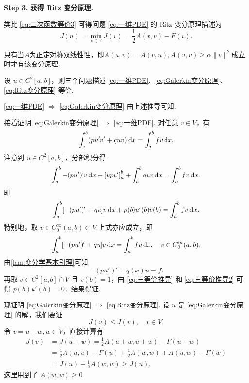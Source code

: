 \noindent\textbf{Step 3. 获得 Ritz 变分原理.} 

类比 \eqref{eq:二次函数等价3} 可得问题 \eqref{eq:一维PDE} 的 Ritz 变分原理描述为
\begin{equation}\label{eq:Ritz变分原理}
    J(u) = \min_{v \in V} J(v) = \frac{1}{2}A(v, v) - F(v).
\end{equation}
\begin{remark}
    只有当$A$为正定对称双线性性，即$A(u,v)=A(v,u),A(u,v)\geq \alpha\|v\|^2$成立时才有该变分原理.
\end{remark}


\begin{theorem}
设 $u \in C^2[a, b]$，则三个问题描述 \eqref{eq:一维PDE}、\eqref{eq:Galerkin变分原理}、\eqref{eq:Ritz变分原理} 等价.
\end{theorem}
\begin{sproof}
    \eqref{eq:一维PDE} $\Rightarrow$ \eqref{eq:Galerkin变分原理} 由上述推导可知.

    接着证明 \eqref{eq:Galerkin变分原理} $\Rightarrow$ \eqref{eq:一维PDE}. 对任意 $v \in V$，有
    \begin{equation*}
        \int_a^b (pu'v' + quv)\mathop{}\!\mathrm{d} x = \int_a^b fv\mathop{}\!\mathrm{d} x,
    \end{equation*}
    注意到 $u \in C^2[a, b]$，分部积分得
    \begin{equation*}
        \int_a^b -(pu')'v\mathop{}\!\mathrm{d} x + \left[vpu'\right]_a^b + \int_a^b quv\mathop{}\!\mathrm{d} x = \int_a^b fv\mathop{}\!\mathrm{d} x,
    \end{equation*}
    即
    \begin{equation}\label{eq:三等价推导}
        \int_a^b [-(pu')' + qu]v\mathop{}\!\mathrm{d} x + p(b)u'(b)v(b) = \int_a^b fv\mathop{}\!\mathrm{d} x.
    \end{equation}
    特别地，取 $v \in C_0^\infty(a, b) \subset V$ 上式亦应成立，即
    \begin{equation*}
        \int_a^b [-(pu')' + qu]v\mathop{}\!\mathrm{d} x = \int_a^b fv\mathop{}\!\mathrm{d} x, \quad v \in C_0^\infty(a, b).
    \end{equation*}
    由\cref{lem:变分学基本引理}可知
    \begin{equation}\label{eq:三等价推导2}
        -(pu')' + q(x)u = f.
    \end{equation}
    再取 $v \in C^2[a,b] \cap V$ 且 $v(b) = 1$，由 \eqref{eq:三等价推导} 和 \eqref{eq:三等价推导2} 可得 $p(b)u'(b) = 0$，结果得证.

    现证明 \eqref{eq:Galerkin变分原理} $\Rightarrow$ \eqref{eq:Ritz变分原理}. 设 $u$ 是 \eqref{eq:Galerkin变分原理} 的解，我们要证
    \begin{equation*}
        J(u) \leq J(v), \quad v \in V.
    \end{equation*}
    令 $v = u + w, w \in V$，直接计算有
    \begin{align*}
        J(v) &= J(u + w) = \frac{1}{2}A(u+w, u+w) - F(u+w) \\[-1pt]
        &= \frac{1}{2}A(u, u) - F(u) + \frac{1}{2}A(w, w) + A(u, w) - F(w)  \\[-1pt]
        &= J(u) + \frac{1}{2}A(w, w) \geq J(u),
    \end{align*}
    这里用到了 $A(w, w) \geq 0$.


\end{sproof}
